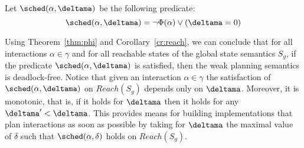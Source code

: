   Let $\sched(\alpha,\deltama)$ be the following predicate:
  \begin{displaymath}
    \sched(\alpha,\deltama) = \neg\Phi(\alpha)\vee(\deltama=0)
  \end{displaymath}

  Using Theorem~\ref{thm:phi} and Corollary~\ref{cr:reach}, we can conclude that for all interactions $\alpha\in\gamma$ and for all reachable states of the global state semantics $S_g$,
  if the predicate $\sched(\alpha,\deltama)$ is satisfied, then the weak planning semantics is deadlock-free.
  Notice that given an interaction $\alpha \in \gamma$ the satisfaction of $\sched(\alpha,\deltama)$ on $Reach(S_g)$ depends only on $\deltama$.
  Moreover, it is monotonic, that is, if it holds for $\deltama$ then it holds for any $\deltama' < \deltama$.
  This provides means for building implementations that plan interactions as soon as possible by taking for $\deltama$ the maximal value of $\delta$ such that $\sched(\alpha,\delta)$ holds on $Reach(S_g)$.
  
